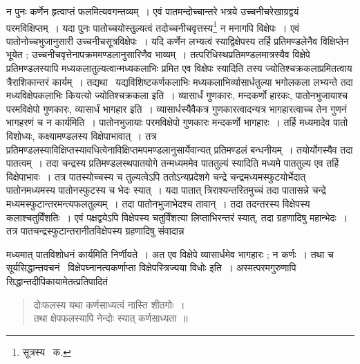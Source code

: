 \documentclass[11pt, openany]{book}
\begin{document}
\noindent न पुनः कर्णेन हृत्वाप्तं फलमित्यवगन्तव्यम्~। एवं पातमन्दोच्चान्तरे भत्रये उच्चनीचरेखाग्रद्वयं परमविक्षिप्तम्~। 
यदा पुनः पातोच्चयोस्तुल्यत्वं तदोच्चनीचवृत्तस्य\renewcommand{\thefootnote}{३}\footnote{सूत्रस्य \textendash\ क.} न मनागपि विक्षेपः~। एवं पातोनोच्चभुजानुसारी उच्चनीचसूत्रविक्षेपः~। यदि कर्णेन लभ्यत्वं स्याद्विक्षेपस्य तर्हि प्रतिमण्डलेनैव विक्षिप्तेन भूयेत ; उच्चनीचवृत्तेनापक्रममण्डलानुसारिणैव भाव्यम्~। तत्परिधिस्थप्रतिमण्डलमात्रस्यैव विक्षेपे प्रतिमण्डलस्यापि मध्यकलातुल्यत्वान्मध्यकलाभिः प्रमित एव विक्षेपः स्यादिति तस्य ज्योतिश्चक्रकलाप्रमितत्वाय त्रैराशिकान्तरं कार्यम्~। तद्यथा \textendash\ यद्यविशिष्टकर्णकलाभिः मध्यकलाभिर्व्यासार्धतुल्या भगोलकला लभ्यन्ते तदा मध्यविक्षेपकलाभिः कियत्यो ज्योतिश्चक्रकला इति~। व्यासार्धं गुणकारः, मन्दकर्णो हारकः, पातोनभुजायाश्च परमविक्षेपो गुणकारः, व्यासार्धं भागहार इति~। व्यासार्धस्यैवैकत्र गुणकारत्वादन्यत्र भागहारत्वाच्च तेन गुणनं भागहरणं च न कार्यमिति~। पातोनभुजायाः परमविक्षेपो गुणकारः मन्दकर्णो भागहारः~। तर्हि मध्यमादेव पातो विशोध्यः, कक्ष्यामण्डलस्य विक्षेपाभावात्~। तत्र प्रतिमण्डलस्याविक्षिप्तस्यावधित्वेनाविक्षिप्तमपमण्डलानुसार्येवान्यत् प्रतिमण्डलं बन्धनीयम्~। तयोर्योगस्यैव तदा पातत्वम्~। तदा चन्द्रस्य प्रतिमण्डलस्थपातयोगे तन्मध्यममेव पाततुल्यं स्यादिति मध्यमे पाततुल्य एव तर्हि विक्षेपाभावः~। तत्र पातस्योच्चस्य च तुल्यत्वेऽपि ततोऽन्यप्रदेशगे चन्द्रे चन्द्रमध्यमस्फुटयोर्भेदात् पातोनमध्यमस्य पातोनस्फुटस्य च भेदः स्यात्~। यदा पातात् त्रिराश्यन्तरितमुच्चं तदा पातासन्ने चन्द्रे मध्यमस्फुटान्तरमन्त्यफलतुल्यम्~। तदा पातोनभुजाभेदश्च तावान्~। तदा तदन्तरस्य विक्षेपस्य कलाश्चतुर्विंशतिः~। एवं पक्षद्वयेऽपि विक्षेपस्य चतुर्विंशत्या लिप्ताभिरन्तरं स्यात्, तदा ग्रहणादिषु महान्भेदः~। तत्र पातचन्द्रस्फुटान्तरानीतविक्षेपस्य ग्रहणादिषु संवादान्न


\newpage

\noindent मध्यमात् पातविशोधनं कार्यमिति निर्णीयते~। अत एव विक्षेपे व्यासार्धमेव भागहारः ; न कर्णः~। तथा च सूर्यसिद्धान्तवचनं \textendash\ {\qt विक्षेपघ्नानत्यकर्णाप्ता विक्षेपस्त्रिज्यया विधोः} इति~। अस्मत्परमगुरुणापि सिद्धान्तदीपिकायामेतत्प्रतिपादितं\textendash 

\begin{quote}
{\qt दोःफलस्य यथा कर्णसाध्यत्वं नास्ति शीतगोः~।\\
 तथा क्षेपफलस्यापि नेन्दोः स्यात् कर्णसाध्यता~॥} 
\end{quote}
\end{document}
